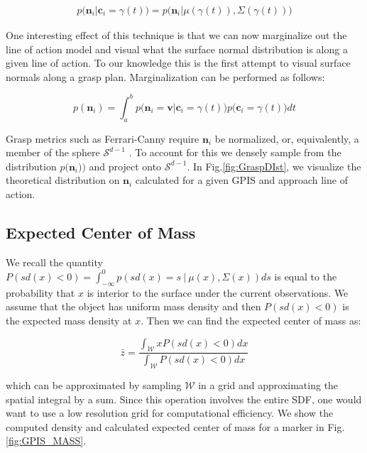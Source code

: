 \documentclass[letterpaper, 10 pt, conference]{ieeeconf}  %
\begin{document}
\vspace{-2ex}
\begin{align*}
p\big(\textbf{n}_i|\textbf{c}_i = \gamma(t)\big) = p\big(\textbf{n}_i |\mu(\gamma(t)), \Sigma(\gamma(t)) \big)
\end{align*}

One interesting effect of this technique is that we can now marginalize out the line of action model and visual what the surface normal distribution is along a given line of action. To our knowledge this is the first attempt to visual surface normals along a grasp plan. Marginalization can be performed as follows:

\vspace{-2ex}
\begin{equation}
p(\textbf{n}_i ) = \int_a^b   p\big(\textbf{n}_i = \textbf{v} | \textbf{c}_i = \gamma(t) \big)p\big(\textbf{c}_i = \gamma(t)\big) dt
\end{equation}

Grasp metrics such as  Ferrari-Canny require $\textbf{n}_i$ be normalized, or, equivalently, a member of the sphere $\mathcal{S}^{d-1}$ \cite{ferrari1992}. To account for this we densely sample from the  distribution $p \big(\textbf{n}_i ) \big)$  and project onto $\mathcal{S}^{d-1}$.  In Fig.\ref{fig:GraspDIst}, we visualize the theoretical distribution on $\textbf{n}_i$ calculated for a given GPIS and approach line of action.


\subsection{Expected Center of Mass}\label{sec:mass} 

We recall the quantity $P(sd(x) < 0) = \int_{-\infty}^{0} p(sd(x) =  s \ | \ \mu(x),\Sigma(x)) ds$ is equal to the probability that $x$ is interior to the surface under the current observations.
We assume that the object has uniform mass density and then $P(sd(x) < 0)$ is the expected mass density at $x$.
Then we can find the expected center of mass as:

\begin{equation}
  \bar{z} 
  =
  \frac
    {\int_{\mathcal{W}}x P(sd(x)<0) dx}
    {\int_{\mathcal{W}}  P(sd(x)<0) dx}
\end{equation}

which can be approximated by sampling $\mathcal{W}$ in a grid and approximating the spatial integral by a sum. Since this operation involves the entire SDF, one would want to use a low resolution grid for computational efficiency. We show the computed density and calculated expected center of mass for a marker in Fig. \ref{fig:GPIS_MASS}.
\end{document}
